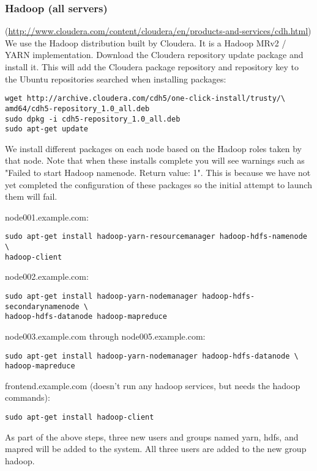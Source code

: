 \subsubsection{Hadoop (all servers)} (\url{http://www.cloudera.com/content/cloudera/en/products-and-services/cdh.html})\\
We use the Hadoop distribution built by Cloudera.  It is a Hadoop MRv2 /
YARN implementation.  Download the Cloudera repository update package and
install it.  This will add the Cloudera package repository and repository
key to the Ubuntu repositories searched when installing packages:

\begin{verbatim}
wget http://archive.cloudera.com/cdh5/one-click-install/trusty/\
amd64/cdh5-repository_1.0_all.deb
sudo dpkg -i cdh5-repository_1.0_all.deb
sudo apt-get update
\end{verbatim}

We install different packages on each node based on the Hadoop roles
taken by that node.  Note that when these installs complete you will see
warnings such as "Failed to start Hadoop namenode. Return value: 1".
This is because we have not yet completed the configuration of these
packages so the initial attempt to launch them will fail.

node001.example.com:
\begin{verbatim}
sudo apt-get install hadoop-yarn-resourcemanager hadoop-hdfs-namenode \
hadoop-client
\end{verbatim}

node002.example.com:
\begin{verbatim}
sudo apt-get install hadoop-yarn-nodemanager hadoop-hdfs-secondarynamenode \
hadoop-hdfs-datanode hadoop-mapreduce 
\end{verbatim}

node003.example.com through node005.example.com:
\begin{verbatim}
sudo apt-get install hadoop-yarn-nodemanager hadoop-hdfs-datanode \
hadoop-mapreduce
\end{verbatim}

frontend.example.com (doesn't run any hadoop services, but needs the hadoop commands):
\begin{verbatim}
sudo apt-get install hadoop-client
\end{verbatim}

As part of the above steps, three new users and groups named yarn, hdfs,
and mapred will be added to the system.  All three users are added to
the new group hadoop.

